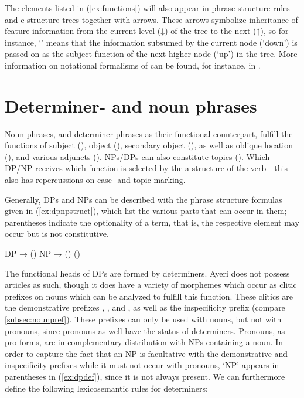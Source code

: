 The elements listed in (\ref{ex:functions}) will also appear in 
phrase-structure rules and c-structure trees together with arrows. These arrows 
symbolize inheritance of feature information from the current level (↓) of the 
tree to the next (↑), so for instance, `\pass{\Sbj}' means that the information 
subsumed by the current node (`down') is passed on as the subject function of 
the next higher node (`up') in the tree. More information on notational 
formalisms of \lfg{} can be found, for instance, in \citet{buttking2015}.

\section{Determiner- and noun phrases}

Noun phrases, and determiner phrases as their functional counterpart, fulfill 
the functions of subject (\Sbj{}), object (\Obj{}), secondary object (\SObj{}), 
as well as oblique location (), and various adjuncts (\Adjc{}). 
NPs/DPs can also constitute topics (\Top{}). Which DP/NP receives which 
function is selected by the a-structure of the verb---this also has 
repercussions on case- and topic marking.

Generally, DPs and NPs can be described with the phrase structure formulas 
given in (\ref{ex:dpnpstruct}), which list the various parts that can occur in 
them; parentheses indicate the optionality of a term, that is, the respective 
element may occur but is not constitutive.

\pex\label{ex:dpnpstruct}
\a\label{ex:dpdef} DP →  ()
\a\label{ex:npdef} NP →  () ()
\xe

The functional heads of DPs are formed by determiners. Ayeri does not possess 
articles as such, though it does have a variety of morphemes which occur 
as clitic prefixes on nouns which can be analyzed to fulfill this function. 
These clitics are the demonstrative prefixes , 
, and , as well as the 
inspecificity prefix  (compare \autoref{subsec:nounpref}). 
These prefixes can only be used with nouns, but not with pronouns, since 
pronouns as well have the status of determiners. Pronouns, as pro-forms, are in 
complementary distribution with NPs containing a noun. In order to capture the 
fact that an NP is facultative with the demonstrative and inspecificity 
prefixes while it must not occur with pronouns, `NP' appears in parentheses in 
(\ref{ex:dpdef}), since it is not always present. We can furthermore define the 
following lexicosemantic rules for determiners:

